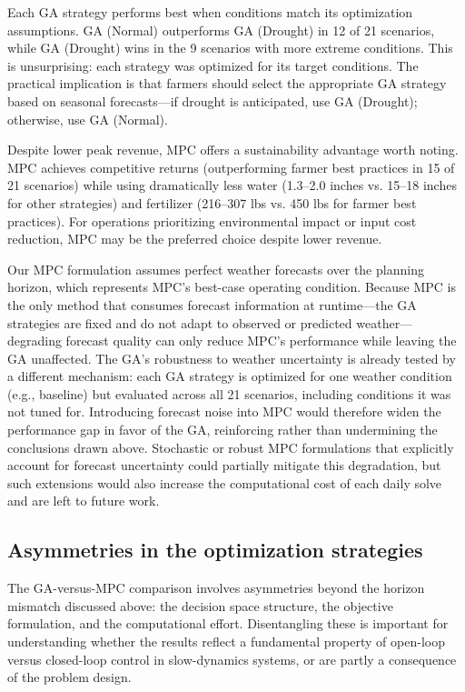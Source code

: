 \documentclass[pdflatex,sn-mathphys-num]{sn-jnl}
\begin{document}
Each GA strategy performs best when conditions match its optimization assumptions. GA (Normal) outperforms GA (Drought) in 12 of 21 scenarios, while GA (Drought) wins in the 9 scenarios with more extreme conditions. This is unsurprising: each strategy was optimized for its target conditions. The practical implication is that farmers should select the appropriate GA strategy based on seasonal forecasts---if drought is anticipated, use GA (Drought); otherwise, use GA (Normal).

Despite lower peak revenue, MPC offers a sustainability advantage worth noting. MPC achieves competitive returns (outperforming farmer best practices in 15 of 21 scenarios) while using dramatically less water (1.3--2.0 inches vs. 15--18 inches for other strategies) and fertilizer (216--307 lbs vs. 450 lbs for farmer best practices). For operations prioritizing environmental impact or input cost reduction, MPC may be the preferred choice despite lower revenue.

Our MPC formulation assumes perfect weather forecasts over the planning horizon, which represents MPC's best-case operating condition. Because MPC is the only method that consumes forecast information at runtime---the GA strategies are fixed and do not adapt to observed or predicted weather---degrading forecast quality can only reduce MPC's performance while leaving the GA unaffected. The GA's robustness to weather uncertainty is already tested by a different mechanism: each GA strategy is optimized for one weather condition (e.g., baseline) but evaluated across all 21 scenarios, including conditions it was not tuned for. Introducing forecast noise into MPC would therefore widen the performance gap in favor of the GA, reinforcing rather than undermining the conclusions drawn above. Stochastic or robust MPC formulations that explicitly account for forecast uncertainty could partially mitigate this degradation, but such extensions would also increase the computational cost of each daily solve and are left to future work.

\subsection{Asymmetries in the optimization strategies}\label{subsec:asymmetries}

The GA-versus-MPC comparison involves asymmetries beyond the horizon mismatch discussed above: the decision space structure, the objective formulation, and the computational effort. Disentangling these is important for understanding whether the results reflect a fundamental property of open-loop versus closed-loop control in slow-dynamics systems, or are partly a consequence of the problem design.
\end{document}
